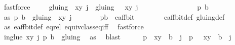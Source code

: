 \begin{isabellebody}
\ fastforce{\isacharplus}\ \isanewline
\ \ \isamarkupfalse%
\ {\isachardoublequoteopen}gluing\ {\isacharbackquote}{\isacharbackquote}\ {\isacharbraceleft}{\isacharparenleft}{\isacharparenleft}x{\isacharcomma}y{\isacharparenright}{\isacharcomma}\ j{\isacharparenright}{\isacharbraceright}\ {\isasymsubseteq}\ gluing\ {\isacharbackquote}{\isacharbackquote}\ {\isacharbraceleft}{\isacharparenleft}{\isasymtau}\ {\isacharparenleft}x{\isacharcomma}y{\isacharparenright}{\isacharcomma}\ j\ {\isacharplus}\ {}{\isacharparenright}{\isacharbraceright}{\isachardoublequoteclose}\isanewline
\ \ \isamarkupfalse%
\ \ \ \ \ \isanewline
\ \ \ \ \isacommand{{\isacharbraceleft}}\isamarkupfalse%
\isamarkupfalse%
\ p\ b\isanewline
\ \ \ \ \isamarkupfalse%
\ as{\isacharcolon}\ {\isachardoublequoteopen}{\isacharparenleft}p{\isacharcomma}\ b{\isacharparenright}\ {\isasymin}\ gluing\ {\isacharbackquote}{\isacharbackquote}\ {\isacharbraceleft}{\isacharparenleft}{\isacharparenleft}x{\isacharcomma}y{\isacharparenright}{\isacharcomma}\ j{\isacharparenright}{\isacharbraceright}{\isachardoublequoteclose}\isanewline
\ \ \ \ \isamarkupfalse%
\ \isamarkupfalse%
\ {\isachardoublequoteopen}{\isacharparenleft}p{\isacharcomma}b{\isacharparenright}\ {\isasymin}\ e{\isacharunderscore}aff{\isacharunderscore}bit{\isachardoublequoteclose}\isanewline
\ \ \ \ \ \ \isamarkupfalse%
\ e{\isacharunderscore}aff{\isacharunderscore}bit{\isacharunderscore}def\ gluing{\isacharunderscore}def\ \isanewline
\ \ \ \ \ \ \isamarkupfalse%
\ as\ e{\isacharunderscore}aff{\isacharunderscore}bit{\isacharunderscore}def\ eq{\isacharunderscore}rel\ equiv{\isacharunderscore}class{\isacharunderscore}eq{\isacharunderscore}iff\ \isamarkupfalse%
\ fastforce\ \ \ \isanewline
\ \ \ \ \isamarkupfalse%
\ in{\isacharunderscore}glue{\isacharcolon}\ {\isachardoublequoteopen}{\isacharparenleft}{\isacharparenleft}{\isacharparenleft}x{\isacharcomma}y{\isacharparenright}{\isacharcomma}\ j{\isacharparenright}{\isacharcomma}\ p{\isacharcomma}\ b{\isacharparenright}\ {\isasymin}\ gluing{\isachardoublequoteclose}\ \isamarkupfalse%
\ as\ \isamarkupfalse%
\ blast\isanewline
\ \ \ \ \isamarkupfalse%
\ {\isachardoublequoteopen}{\isacharparenleft}p\ {\isacharequal}\ {\isacharparenleft}x{\isacharcomma}y{\isacharparenright}\ {\isasymand}\ b\ {\isacharequal}\ j{\isacharparenright}\ {\isasymor}\ {\isacharparenleft}p\ {\isacharequal}\ {\isasymtau}\ {\isacharparenleft}x{\isacharcomma}y{\isacharparenright}\ {\isasymand}\ b\ {\isacharequal}\ j{\isacharplus}{}{\isacharparenright}{\isachardoublequoteclose}\isanewline

\end{isabellebody}
